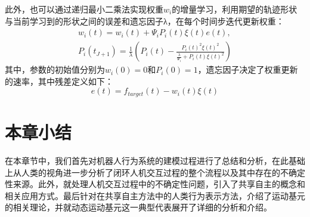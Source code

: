 此外，也可以通过递归最小二乘法实现权重$w_i$的增量学习，利用期望的轨迹形状与当前学习到的形状之间的误差和遗忘因子λ，在每个时间步迭代更新权重：
\begin{equation}
    \begin{gathered}
    w_i(t)=w_i(t)+\Psi_i P_i\left(t\right) \xi(t) e\left(t\right), \\
    P_i\left(t_{J+1}\right)=\frac{1}{\lambda}\left(P_i\left(t\right)-\frac{P_i\left(t\right)^2 \xi(t)^2}{\frac{\lambda}{\Psi_i}+P_i\left(t\right) \xi(t)^2}\right)
    \end{gathered}
    \label{eq:2-17}
\end{equation}
其中，参数的初始值分别为$w_i(0)=0$和$P_i(0)=1$，遗忘因子决定了权重更新的速率，其中残差定义如下：
\begin{equation}
    e\left(t\right)=f_{target}\left(t\right)-w_i\left(t\right) \xi(t)
    \label{eq:2-18}
\end{equation}
\section{本章小结}
在本章节中，我们首先对机器人行为系统的建模过程进行了总结和分析，在此基础上从人类的视角进一步分析了闭环人机交互过程的整个流程以及其中存在的不确定性来源。此外，就处理人机交互过程中的不确定性问题，引入了共享自主的概念和相关应用方式。最后针对在共享自主方法中的人类行为表示方法，介绍了运动基元的相关理论，并就动态运动基元这一典型代表展开了详细的分析和介绍。